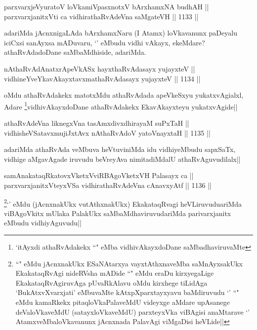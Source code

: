 \begin{shl}
parxvarxjeVyuratoV loVkamiVpasxnotxV bArxhamxNA budhAH || \\
parxvarxjanitxVti ca vidhirathaRvAdeVna saMgateVH ||  1133 ||  
\end{shl}

\begin{artha}
adariMda jAcnxnigaLAda bArxhamxNaru (I Atamx) loVkavanunx paDeyalu iciCxsi sanAyxsa mADuvaru, `\stext' eMbudu vidhi vAkayx, ekeMdare? athaRvAdadoDane saMbaMdhiside, adariMda.
\end{artha}


\begin{shl}
nAthaRvAdAnatxrApeVkASx hayxthaRvAdasayx yujayxteV || \\
vidhineYveYkavAkayxtavxmathaRvAdasayx yujayxteV ||  1134 ||  
\end{shl}

\begin{artha}
oMdu athaRvAdakekx matotxMdu athaRvAdada apeVkeSxyu yukatxvAgialxl, Adare \footnote{`\stext itAyxdi athaRvAdakekx ``\stext" eMba vidhivAkayxdoDane saMbadhaviruvaMte}vidhivAkayxdoDane athaRvAdakekx EkavAkayxteyu yukatxvAgide||
\end{artha}

\begin{shl}
athaRvAdeVna liknegxVna tasAmxdivxdhirayaM suPxTaH || \\
vidhisheVSatavxmujiJxtAvx nAthaRvAdoV yatoV\s nayxtaH ||  1135 ||  
\end{shl}

\begin{artha}
adariMda athaRvAda veMbuva heVtuviniMda idu vidhiyeMbudu sapxSaTx, vidhige aMgavAgade iruvudu beVreyAva nimitadiMdalU athaRvAguvudilalx||
\end{artha}


\begin{shl}
samAnakataqRkatovxVketxVviRBAgoVketxVH Palasayx ca || \\
parxvarxjanitxVteyxVSa vidhirathaRvAdeVna cAnavxyAtf ||  1136 ||  
\end{shl}

\begin{artha}
\footnote{``\stext" eMdu jAcnxnakUkx ESaNAtarxya vayxtAthxnaveMba saMnAyxsakUkx EkakataqRvAgi nideRVsha mADide ``\stext" eMdu eraDu kirxyegaLige EkakataqRvAgiruvAga pUvaRkAlavu oMdu kirxhege tiLidAga `BukAtxvXvarxjati' eMbuvaMte kAtxpXparxtayxyavu baMdiruvudu `\stext' ``\stext" eMdu kamaRkekx pitaqloVkaPalaveMdU videyxge aMdare upAsanege deValoVkaveMdU (satayxloVkaveMdU) parxteyxVka viBAgisi anaMtarave `\stext' AtamxveMbaloVkavanunx jAcnxnada PalavAgi viMgaDisi heVLide||}`\stext' eMdu (jAcnxnakUkx vutAthxnakUkx) EkakataqRvagi heVLiruvuduariMda viBAgoVkitx mUlaka PalakUkx saMbaMdhaviruvudariMda parivarxjanitx eMbudu vidhiyAguvudu|| 
\end{artha}

